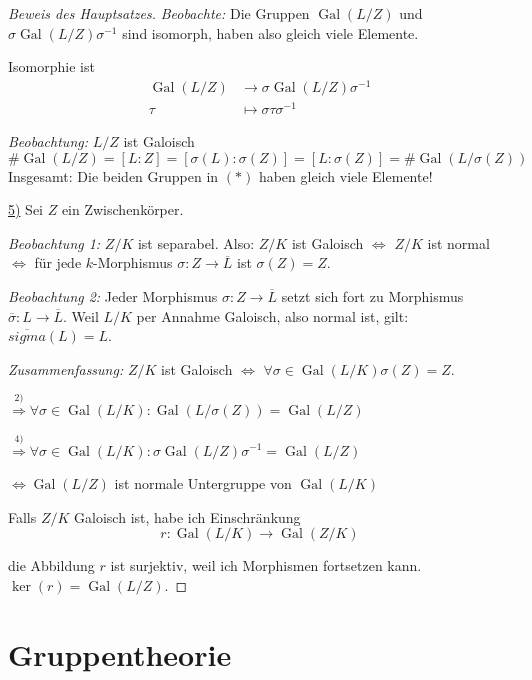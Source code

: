 \documentclass[12pt,parskip=full]{scrartcl}
\newcommand{\heading}{\underline}
\DeclareMathOperator{\Gal}{Gal}
\theoremstyle{definition}
\theoremstyle{remark}
\begin{document}
\begin{proof}[Beweis des Hauptsatzes]
		\textit{Beobachte:} Die Gruppen $\Gal(L/Z)$ und $\sigma \Gal(L/Z) \sigma^{-1}$ sind isomorph, haben also gleich viele Elemente.
		
		Isomorphie ist
		\begin{align*}
			\Gal(L/Z) &\to \sigma \Gal(L/Z) \sigma^{-1} \\
			\tau &\mapsto \sigma \tau \sigma^{-1}
		\end{align*}
		
		\textit{Beobachtung:} $L/Z$ ist Galoisch
		\begin{equation*}
			\#\Gal(L/Z) = [L:Z] = [\sigma(L): \sigma(Z)] = [L: \sigma(Z)] = \#\Gal(L/\sigma(Z))
		\end{equation*}
		Insgesamt: Die beiden Gruppen in $(*)$ haben gleich viele Elemente!
		
		\heading{5)} Sei $Z$ ein Zwischenkörper.
		
		\textit{Beobachtung 1:} $Z/K$ ist separabel. Also: $Z/K$ ist Galoisch $\Leftrightarrow$ $Z/K$ ist normal $\Leftrightarrow$ für jede $k$-Morphismus $\sigma: Z \to \overline{L}$ ist $\sigma(Z) = Z$.
		
		\textit{Beobachtung 2:} Jeder Morphismus $\sigma: Z \to \overline{L}$ setzt sich fort zu Morphismus $\overline{\sigma}: L \to \overline{L}$. Weil $L/K$ per Annahme Galoisch, also normal ist, gilt: $\overline{sigma}(L) = L$.
		
		\textit{Zusammenfassung:} $Z/K$ ist Galoisch $\Leftrightarrow$ $\forall \sigma \in \Gal(L/K) \sigma(Z) = Z$.
		
		$\overset{2)}{\Rightarrow} \forall \sigma \in \Gal(L/K): \Gal(L/\sigma(Z)) = \Gal(L/Z)$
		
		$\overset{4)}{\Rightarrow} \forall \sigma \in \Gal(L/K): \sigma \Gal(L/Z) \sigma^{-1} = \Gal(L/Z)$
		
		$\Leftrightarrow \Gal(L/Z)$ ist normale Untergruppe von $\Gal(L/K)$
		
		Falls $Z/K$ Galoisch ist, habe ich Einschränkung
		\begin{equation*}
			r: \Gal(L/K) \to \Gal(Z/K)
		\end{equation*}
		
		die Abbildung $r$ ist surjektiv, weil ich Morphismen fortsetzen kann. $\ker(r) = \Gal(L/Z)$.
 		
	\end{proof}

	\section{Gruppentheorie}
	
\end{document}
